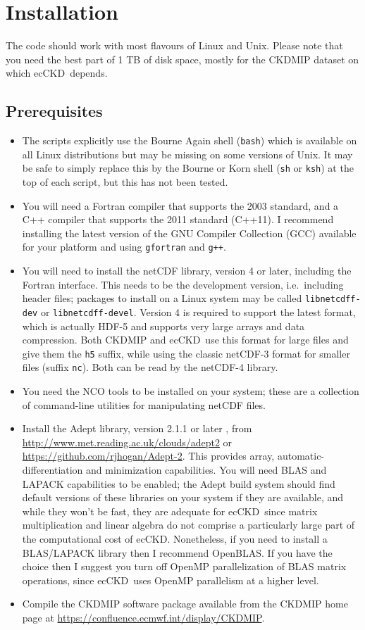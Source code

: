 \documentclass[a4,oneside]{article}
\def\codesize{\small}
\newcommand{\ecckd}{ecCKD}
\def\codesize{\small}
\def\code#1{{\codesize\texttt{#1}}}
\begin{document}
\section{Installation}
\label{sec:installation}
The code should work with most flavours of Linux and Unix. Please note
that you need the best part of 1 TB of disk space, mostly for the
CKDMIP dataset on which \ecckd\ depends.
\subsection{Prerequisites}
\begin{itemize}
\item The scripts explicitly use the Bourne Again shell (\code{bash})
  which is available on all Linux distributions but may be missing on
  some versions of Unix. It may be safe to simply replace this by the
  Bourne or Korn shell (\code{sh} or \code{ksh}) at the top of each
  script, but this has not been tested.
\item You will need a Fortran compiler that supports the 2003
  standard, and a C++ compiler that supports the 2011 standard
  (C++11).  I recommend installing the latest version of the GNU
  Compiler Collection (GCC) available for your platform and using
  \code{gfortran} and \code{g++}.
\item You will need to install the netCDF library, version 4 or later,
  including the Fortran interface. This needs to be the development
  version, i.e.\ including header files; packages to install on a
  Linux system may be called \code{libnetcdff-dev} or
  \code{libnetcdff-devel}. Version 4 is required to support the latest
  format, which is actually HDF-5 and supports very large arrays and
  data compression. Both CKDMIP and \ecckd\ use this format for large
  files and give them the \code{h5} suffix, while using the classic
  netCDF-3 format for smaller files (suffix \code{nc}). Both can be
  read by the netCDF-4 library.
\item You need the NCO tools to be installed on your system; these are
  a collection of command-line utilities for manipulating netCDF
  files.
\item Install the Adept library, version 2.1.1 or later
  \citep{Hogan2014}, from
  \url{http://www.met.reading.ac.uk/clouds/adept2} or
  \url{https://github.com/rjhogan/Adept-2}. This provides array,
  automatic-differentiation and minimization capabilities. You will
  need BLAS and LAPACK capabilities to be enabled; the Adept build
  system should find default versions of these libraries on your
  system if they are available, and while they won't be fast, they are
  adequate for \ecckd\ since matrix multiplication and linear algebra
  do not comprise a particularly large part of the computational cost
  of \ecckd.  Nonetheless, if you need to install a BLAS/LAPACK
  library then I recommend OpenBLAS. If you have the choice then I
  suggest you turn off OpenMP parallelization of BLAS matrix
  operations, since \ecckd\ uses OpenMP parallelism at a higher level.
\item Compile the CKDMIP software package available from the CKDMIP
  home page at \url{https://confluence.ecmwf.int/display/CKDMIP}.
\end{itemize}
\end{document}
